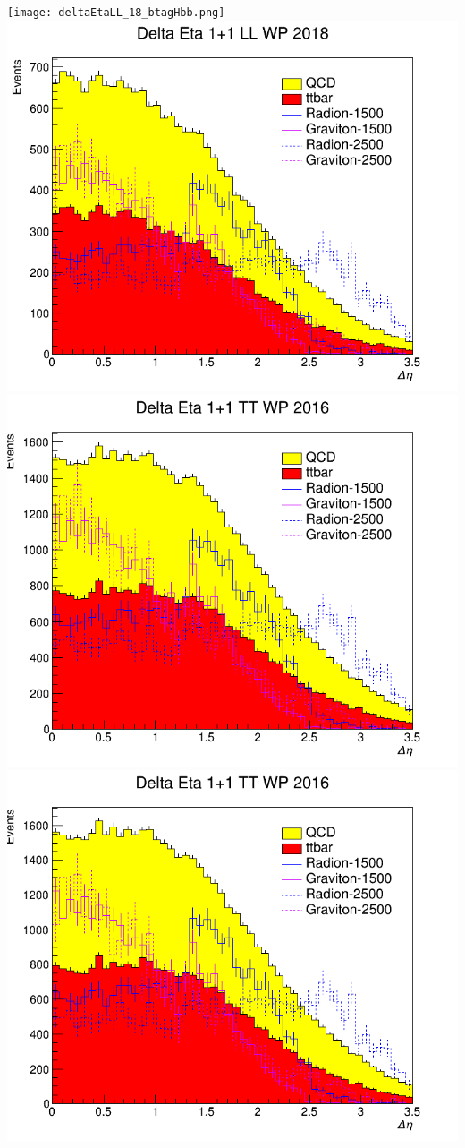 \texttt{[image: deltaEtaLL\_18\_btagHbb.png]}
\includegraphics[width=1\textwidth]{deltaEtaLL_18_deepTagMD_HbbvsQCD.png}
\includegraphics[width=1\textwidth]{deltaEtaTT_16_btagHbb.png}
\includegraphics[width=1\textwidth]{deltaEtaTT_16_deepTagMD_HbbvsQCD.png}
